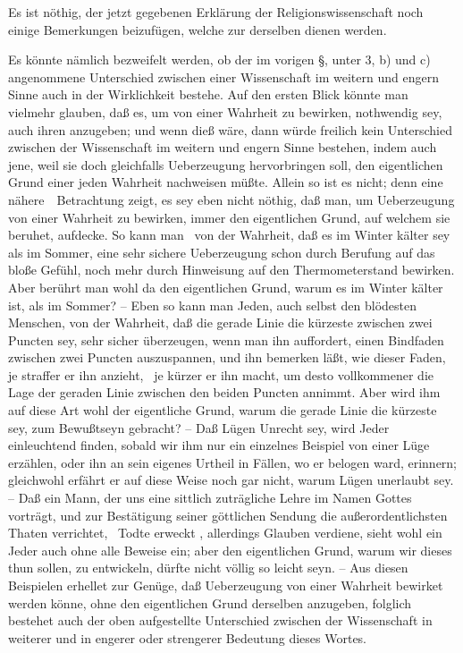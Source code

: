 Es ist nöthig, der jetzt gegebenen Erklärung der Religionswissenschaft noch einige Bemerkungen beizufügen, welche zur  derselben dienen werden.
\begin{aufza}
\item Es könnte nämlich bezweifelt werden, ob der im vorigen §, unter 3, b) und c) angenommene Unterschied zwischen einer Wissenschaft im weitern und engern Sinne auch in der Wirklichkeit bestehe. Auf den ersten Blick könnte man vielmehr glauben, daß es, um  von einer Wahrheit zu bewirken, nothwendig sey, auch ihren  anzugeben; und wenn dieß wäre, dann würde freilich kein Unterschied zwischen der Wissenschaft im weitern und engern Sinne bestehen, indem auch jene, weil sie doch gleichfalls Ueberzeugung hervorbringen soll, den eigentlichen Grund einer jeden Wahrheit nachweisen müßte. Allein so ist es nicht; denn eine nähere~\ Betrachtung zeigt, es sey eben nicht nöthig, daß man, um Ueberzeugung von einer Wahrheit zu bewirken, immer den eigentlichen Grund, auf welchem sie beruhet, aufdecke. So kann man \zB\ von der Wahrheit, daß es im Winter kälter sey als im Sommer, eine sehr sichere Ueberzeugung schon durch Berufung auf das bloße Gefühl, noch mehr durch Hinweisung auf den Thermometerstand bewirken. Aber berührt man wohl da den eigentlichen Grund, warum es im Winter kälter ist, als im Sommer? -- Eben so kann man Jeden, auch selbst den blödesten Menschen, von der Wahrheit, daß die gerade Linie die kürzeste zwischen zwei Puncten sey, sehr sicher überzeugen, wenn man ihn auffordert, einen Bindfaden zwischen zwei Puncten auszuspannen, und ihn bemerken läßt, wie dieser Faden, je straffer er ihn anzieht, \dh\ je kürzer er ihn macht, um desto vollkommener die Lage der geraden Linie zwischen den beiden Puncten annimmt. Aber wird ihm auf diese Art wohl der eigentliche Grund, warum die gerade Linie die kürzeste sey, zum Bewußtseyn gebracht? -- Daß Lügen Unrecht sey, wird Jeder einleuchtend finden, sobald wir ihm nur ein einzelnes Beispiel von einer Lüge erzählen, oder ihn an sein eigenes Urtheil in Fällen, wo er belogen ward, erinnern; gleichwohl erfährt er auf diese Weise noch gar nicht, warum Lügen unerlaubt sey. -- Daß ein Mann, der uns eine sittlich zuträgliche Lehre im Namen Gottes vorträgt, und zur Bestätigung seiner göttlichen Sendung die außerordentlichsten Thaten verrichtet, \zB\ Todte erweckt \udgl , allerdings Glauben verdiene, sieht wohl ein Jeder auch ohne alle Beweise ein; aber den eigentlichen Grund, warum wir dieses thun sollen, zu entwickeln, dürfte nicht völlig so leicht seyn. -- Aus diesen Beispielen erhellet zur Genüge, daß Ueberzeugung von einer Wahrheit bewirket werden könne, ohne den eigentlichen Grund derselben anzugeben, folglich bestehet auch der oben aufgestellte Unterschied zwischen der Wissenschaft in weiterer und in engerer oder strengerer Bedeutung dieses Wortes.

\end{aufza}
